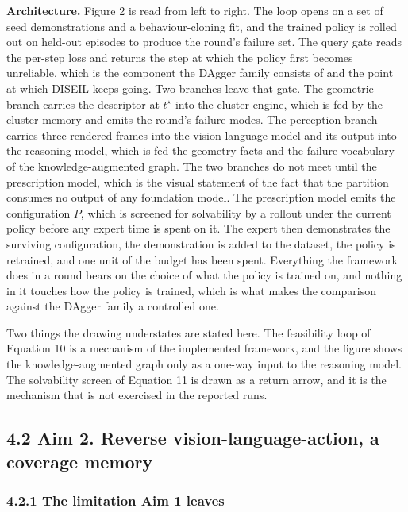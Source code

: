 \documentclass[
  11pt,
]{article}
\begin{document}
\textbf{Architecture.} Figure 2 is read from left to right. The loop
opens on a set of seed demonstrations and a behaviour-cloning fit, and
the trained policy is rolled out on held-out episodes to produce the
round's failure set. The query gate reads the per-step loss and returns
the step at which the policy first becomes unreliable, which is the
component the DAgger family consists of and the point at which DISEIL
keeps going. Two branches leave that gate. The geometric branch carries
the descriptor at \(t^\star\) into the cluster engine, which is fed by
the cluster memory and emits the round's failure modes. The perception
branch carries three rendered frames into the vision-language model and
its output into the reasoning model, which is fed the geometry facts and
the failure vocabulary of the knowledge-augmented graph. The two
branches do not meet until the prescription model, which is the visual
statement of the fact that the partition consumes no output of any
foundation model. The prescription model emits the configuration \(P\),
which is screened for solvability by a rollout under the current policy
before any expert time is spent on it. The expert then demonstrates the
surviving configuration, the demonstration is added to the dataset, the
policy is retrained, and one unit of the budget has been spent.
Everything the framework does in a round bears on the choice of what the
policy is trained on, and nothing in it touches how the policy is
trained, which is what makes the comparison against the DAgger family a
controlled one.

Two things the drawing understates are stated here. The feasibility loop
of Equation 10 is a mechanism of the implemented framework, and the
figure shows the knowledge-augmented graph only as a one-way input to
the reasoning model. The solvability screen of Equation 11 is drawn as a
return arrow, and it is the mechanism that is not exercised in the
reported runs.

\hypertarget{aim-2.-reverse-vision-language-action-a-coverage-memory}{%
\subsection{4.2 Aim 2. Reverse vision-language-action, a coverage
memory}\label{aim-2.-reverse-vision-language-action-a-coverage-memory}}

\hypertarget{the-limitation-aim-1-leaves}{%
\subsubsection{4.2.1 The limitation Aim 1
leaves}\label{the-limitation-aim-1-leaves}}
\end{document}
